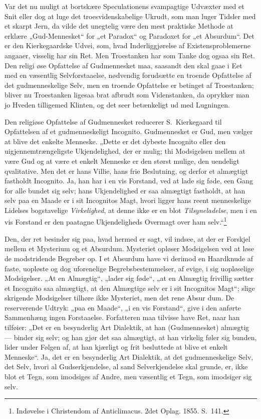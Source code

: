 \documentclass[12pt]{book}
\begin{document}
Var det nu muligt at bortskære Speculationens svampagtige Udvæxter
med et Snit eller dog at luge det troesvidenskabelige Ukrudt, som man
luger Tidsler med et skarpt Jern, da vilde det unegtelig være den
mest praktiske Methode at erklære „Gud-Mennesket“ for „et Paradox“
og Paradoxet for „et Absurdum“. Det er den Kierkegaardske Udvei,
som, hvad Inderliggjørelse af Existensproblemerne angaaer, visselig
har sin Ret. Men Troestanken har som Tanke dog ogsaa sin Ret. Den
religi\-
øse Opfattelse af Gudmennesket maa, saasandt den skal gaae i Eet med
en væsentlig Selvforstaaelse, nødvendig forudsætte en troende
Opfattelse af det gudmenneskelige Selv, men en troende Opfattelse er
betinget af Troestanken; bliver nu Troestanken ligesaa brat afbrudt
som Videnstanken, da oprykker man jo Hveden tilligemed Klinten, og
det seer betænkeligt ud med Lugningen.

Den religiøse Opfattelse af Gudmennesket reducerer S.\ Kierkegaard
til Opfattelsen af et gudmenneskeligt Incognito. Gudmennesket er
Gud, men vælger at blive det enkelte Menneske. „Dette er det dybeste
Incognito eller den uigjennemtrængeligste Ukjendelighed, der er
mulig; thi Modsigelsen mellem at være Gud og at være et enkelt
Menneske er den størst mulige, den uendeligt qvalitative. Men det er
hans Villie, hans frie Beslutning, og derfor et almægtigt fastholdt
Incognito. Ja, han har i en vis Forstand, ved at lade sig føde, een
Gang for alle bundet sig selv; hans Ukjendelighed er saa almægtigt
fastholdt, at han selv paa en Maade er i sit Incognitos Magt, hvori
ligger hans reent menneskelige Lidelses bogstavelige
\emph{Virkelighed}, at denne ikke er en blot \emph{Tilsyneladelse},
men i en vis Forstand er den paatagne Ukjendeligheds Overmagt over
ham selv.“\footnote{Indøvelse i Christendom af Anticlimacus. 2det
Oplag. 1855. S.\ 141.}

Den, der ret besinder sig paa, hvad hermed er sagt, vil indsee, at
der er Forskjel mellem et Mysterium og et Absurdum. Mysteriet
opløser Modsigelsen ved at løse de modstridende Begreber op. I et
Absurdum have vi derimod en Haardknude af faste, uopløste og dog
uforenelige Begrebsbestemmelser, af evige, i sig uopløselige
Modsigelser. „At en Almægtig“, „lader sig føde“, „at en Almægtig
frivillig sætter et Incognito saa almægtigt, at den Almægtige selv
er i sit Incognitos Magt“; slige skrigende Modsigelser tilhøre ikke
Mysteriet, men det rene Absur\-
dum. De reserverende Udtryk: „paa en Maade“, „i en vis Forstand“,
give i den anførte Sammenhæng ingen Forstaaelse. Forfatteren maa
tilvisse have Ret, naar han tilføier: „Det er en besynderlig Art
Dialektik, at han (Gudmennesket) almægtig --- binder sig selv; og
han gjør det saa almægtigt, at han virkelig føler sig bunden, lider
under Følgen af, at han kjærligt og frit besluttede at blive et
enkelt Menneske“. Ja, det er en besynderlig Art Dialektik, at det
gudmenneskelige Selv, det Selv, hvori al Gudserkjendelse, al sand
Selverkjendelse skal grunde, er, ikke blot et Tegn, som imodsiges af
Andre, men væsentlig et Tegn, som imodsiger sig selv.
\end{document}
